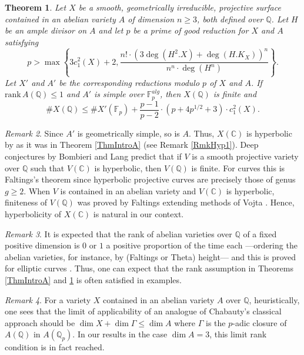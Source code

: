 \documentclass[11pt]{amsart}
\newtheorem{theorem}{Theorem}[section]
\theoremstyle{remark}
\newtheorem{remark}[theorem]{Remark}
\numberwithin{equation}{section}
\newcommand{\C}{\mathbb{C}}
\newcommand{\F}{\mathbb{F}}
\newcommand{\Q}{\mathbb{Q}}
\newcommand{\rk}{\mathrm{rank}\,}
\begin{document}
\begin{theorem}\label{ThmIntroB} Let $X$ be a smooth, geometrically irreducible, projective surface contained in an abelian variety $A$ of dimension $n\ge 3$, both defined over $\Q$.  Let $H$ be an ample divisor on $A$ and let $p$ be a prime of good reduction for $X$ and $A$ satisfying
$$
p> \max\left\{3 c_1^2(X)+2,\frac{n!\cdot (3\deg(H^{2}.X) + \deg(H.K_X))^n}{n^n\cdot \deg(H^n)}\right\}.
$$
Let $X'$ and $A'$ be the corresponding reductions modulo $p$ of $X$ and $A$.  If $\rk A(\Q)\le 1$ and $A'$ is simple over $\F_p^{alg}$, then $X(\Q)$ is finite and
$$
\#X(\Q) \le \# X'(\F_p) + \frac{p-1}{p-2}\cdot \left(p+4p^{1/2} + 3\right)\cdot c_1^2(X).
$$ 
\end{theorem}

\begin{remark} Since $A'$ is geometrically simple, so is $A$. Thus, $X(\C)$ is hyperbolic  by \cite{Green} as it was in Theorem \ref{ThmIntroA} (see Remark \ref{RmkHyp1}). Deep conjectures by Bombieri and Lang predict that if $V$ is a smooth projective variety over $\Q$ such that $V(\C)$ is hyperbolic, then $V(\Q)$ is finite. For curves this is Faltings's theorem since hyperbolic projective curves are precisely those of genus $g\ge 2$. When $V$ is contained in an abelian variety and $V(\C)$ is hyperbolic, finiteness of $V(\Q)$ was proved by Faltings \cite{Faltings2} extending methods of Vojta \cite{VojtaCompact}.  Hence, hyperbolicity of $X(\C)$ is natural in our context.
\end{remark}

\begin{remark}\label{RmkRk} It is expected that the rank of abelian varieties over $\Q$ of a fixed positive dimension is $0$ or $1$ a positive proportion of the time each ---ordering the abelian varieties, for instance, by (Faltings or Theta) height--- and this is proved for elliptic curves \cite{BhargavaShankar, BhargavaSkinner}. Thus, one can expect that the rank assumption in Theorems \ref{ThmIntroA} and \ref{ThmIntroB} is often satisfied in examples.
\end{remark}

\begin{remark} For a variety $X$  contained in an abelian variety $A$ over $\Q$, heuristically, one sees that the limit of applicability of an analogue of Chabauty's classical approach should be $\dim X+ \dim \Gamma \le \dim A$ where $\Gamma$ is the $p$-adic closure of $A(\Q)$ in $A(\Q_p)$. In our results in the case $\dim A=3$, this limit rank condition is in fact reached. 
\end{remark}
\end{document}
